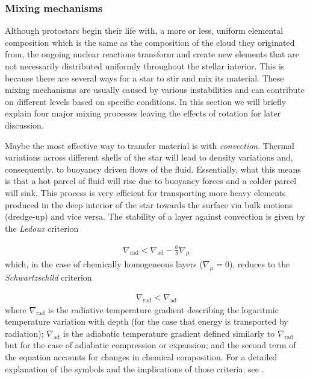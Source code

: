 \documentclass[../../main/thesis_msc.tex]{subfiles}
\begin{document}
				
				
				
				
				
				
				
					\subsubsection{Mixing mechanisms}
					
						Although protostars begin their life with, a more or less, uniform elemental composition which is the same as the composition of the cloud they originated from, the ongoing nuclear reactions transform and create new elements that are not necessarily distributed uniformly throughout the stellar interior. This is because there are several ways for a star to stir and mix its material. These mixing mechanisms are usually caused by various instabilities and can contribute on different levels based on specific conditions. In this section we will briefly explain four major mixing processes leaving the effects of rotation for later discussion.
						
						Maybe the most effective way to transfer material is with \emph{convection}. Thermal variations across different shells of the star will lead to density variations and, consequently, to buoyancy driven flows of the fluid. Essentially, what this means is that a hot parcel of fluid will rise due to buoyancy forces and a colder parcel will sink. This process is very efficient for transporting more heavy elements produced in the deep interior of the star towards the surface via bulk motions (dredge-up) and vice versa. The stability of a layer against convection is given by the \emph{Ledoux} criterion
						
						\begin{eqnarray}
							\nabla_{\text{rad}} < \nabla_{\text{ad}} - \frac{\phi}{\delta} \nabla_{\mu}
						\end{eqnarray}
						which, in the case of chemically homogeneous layers ($\nabla_{\mu} = 0$), reduces to the \emph{Schwartzschild} criterion
						
						\begin{eqnarray}
							\nabla_{\text{rad}} < \nabla_{\text{ad}}
						\end{eqnarray}
						where $\nabla_{\text{rad}}$ is the radiative temperature gradient describing the logaritmic temperature variation with depth (for the case that energy is transported by radiation); $\nabla_{\text{ad}}$ is the adiabatic temperature gradient defined similarly to $\nabla_{\text{rad}}$ but for the case of adiabatic compression or expansion; and the second term of the equation accounts for changes in chemical composition. For a detailed explanation of the symbols and the implications of those criteria, see \cite[pp.~49-51]{Kipp_book}.
						
\end{document}

